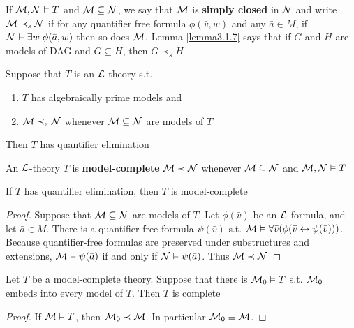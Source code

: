 \documentclass[11pt]{article}
\begin{document}
If \(\mathcal{M},\mathcal{N}\vDash T\) and \(\mathcal{M}\subseteq\mathcal{N}\), we say that
\(\mathcal{M}\) is \textbf{simply closed} in \(\mathcal{N}\) and write \(\mathcal{M}\prec_s\mathcal{N}\) if
for any quantifier free formula \(\phi(\bar{v},w)\) and any \(\bar{a}\in M\),
if \(\mathcal{N}\vDash\exists w\;\phi(\bar{a},w)\) then so does \(\mathcal{M}\). Lemma
\ref{lemma3.1.7} says that if \(G\) and \(H\) are models of DAG and
\(G\subseteq H\), then \(G\prec_s H\)

\begin{corollary}[]
\label{cor3.1.12}
Suppose that \(T\) is an \(\mathcal{L}\)-theory s.t.
\begin{enumerate}
\item \(T\) has algebraically prime models and
\item \(\mathcal{M}\prec_s\mathcal{N}\) whenever \(\mathcal{M}\subseteq\mathcal{N}\) are models of
\(T\)
\end{enumerate}


Then \(T\) has quantifier elimination
\end{corollary}



\begin{definition}[]
An \(\mathcal{L}\)-theory \(T\) is \textbf{model-complete} \(\mathcal{M}\prec\mathcal{N}\) whenever
\(\mathcal{M}\subseteq\mathcal{N}\) and \(\mathcal{M},\mathcal{N}\vDash T\)
\end{definition}

\begin{proposition}[]
If \(T\) has quantifier elimination, then \(T\) is model-complete
\end{proposition}

\begin{proof}
Suppose that \(\mathcal{M}\subseteq\mathcal{N}\) are models of \(T\). Let \(\phi(\bar{v})\)
be an \(\mathcal{L}\)-formula, and let \(\bar{a}\in M\). There is a quantifier-free
formula \(\psi(\bar{v})\) s.t. \(\mathcal{M}\vDash\forall\bar{v}(\phi(\bar{v}\leftrightarrow\psi(\bar{v})))\).
Because quantifier-free formulas are preserved under substructures and
extensions, \(\mathcal{M}\vDash\psi(\bar{a})\) if and only if
\(\mathcal{N}\vDash\psi(\bar{a})\). Thus \(\mathcal{M}\prec\mathcal{N}\)
\end{proof}

\begin{proposition}[]
\label{prop3.1.15}
Let \(T\) be a model-complete theory. Suppose that there is
\(\mathcal{M}_0\vDash T\) s.t. \(\mathcal{M}_0\) embeds into every model of \(T\). Then
\(T\) is complete
\end{proposition}

\begin{proof}
If \(\mathcal{M}\vDash T\), then \(\mathcal{M}_0\prec \mathcal{M}\). In particular
\(\mathcal{M}_0\equiv\mathcal{M}\).
\end{proof}
\end{document}
